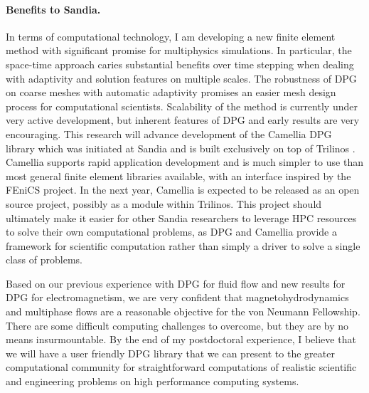 \documentclass[letterpaper,12pt]{article}
\begin{document}
\paragraph{Benefits to Sandia.}
In terms of computational technology, I am developing a new finite element method with significant promise for multiphysics simulations.
In particular, the space-time approach caries substantial benefits over time stepping when dealing with adaptivity and solution features on multiple scales.
The robustness of DPG on coarse meshes with automatic adaptivity promises an easier mesh design process for computational scientists.
Scalability of the method is currently under very active development, but inherent features of DPG and early results are very encouraging.
This research will advance development of the Camellia \cite{CamelliaDPG} DPG library which was initiated at Sandia 
and is built exclusively on top of Trilinos \cite{Trilinos}. %
Camellia supports rapid application development and is much simpler to use
than most general finite element libraries available, with an interface inspired by the FEniCS project.
In the next year, Camellia is expected to be released as an open source project, possibly as a module within Trilinos.
This project should ultimately
make it easier for other Sandia researchers to leverage HPC resources to solve their own computational problems,
as DPG and Camellia provide a framework for scientific computation rather than simply a driver to solve a single class of problems.

Based on our previous experience with DPG for fluid flow and new results for DPG for electromagnetism, we are very confident
that magnetohydrodynamics and multiphase flows are a reasonable objective for the von Neumann Fellowship.
There are some difficult computing challenges to overcome, but they are by no means insurmountable.
By the end of my postdoctoral experience, I believe that we will have a user friendly DPG library that we can present to the greater 
computational community for straightforward computations of realistic scientific and engineering problems on high performance computing systems.

 

\end{document}
